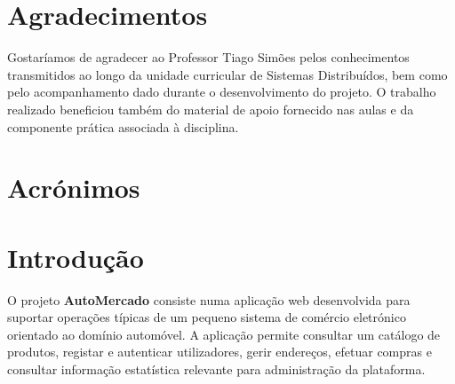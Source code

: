 \documentclass[10pt,a4paper]{report}
\begin{document}
\clearpage{\thispagestyle{empty}\cleardoublepage}
\setcounter{page}{1}

\chapter*{Agradecimentos}
Gostaríamos de agradecer ao Professor Tiago Simões pelos conhecimentos transmitidos ao longo da unidade curricular de Sistemas Distribuídos, bem como pelo acompanhamento dado durante o desenvolvimento do projeto. O trabalho realizado beneficiou também do material de apoio fornecido nas aulas e da componente prática associada à disciplina.

\renewcommand{\contentsname}{Índice}
\tableofcontents

\clearpage
\chapter*{Acrónimos}
\begin{acronym}[JWT]
\end{acronym}

\clearpage
{}
\setcounter{page}{1}

\chapter{Introdução}
\label{chap:introducao}

O projeto \textbf{AutoMercado} consiste numa aplicação web desenvolvida para suportar operações típicas de um pequeno sistema de comércio eletrónico orientado ao domínio automóvel. A aplicação permite consultar um catálogo de produtos, registar e autenticar utilizadores, gerir endereços, efetuar compras e consultar informação estatística relevante para administração da plataforma.
\end{document}
